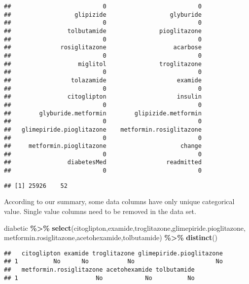 \documentclass[
]{article}
\newenvironment{Shaded}{\begin{snugshade}}{\end{snugshade}}
\newcommand{\FunctionTok}[1]{\textcolor[rgb]{0.13,0.29,0.53}{\textbf{#1}}}
\newcommand{\NormalTok}[1]{#1}
\newcommand{\SpecialCharTok}[1]{\textcolor[rgb]{0.81,0.36,0.00}{\textbf{#1}}}
\begin{document}
\begin{verbatim}
##                          0                          0 
##                  glipizide                  glyburide 
##                          0                          0 
##                tolbutamide               pioglitazone 
##                          0                          0 
##              rosiglitazone                   acarbose 
##                          0                          0 
##                   miglitol               troglitazone 
##                          0                          0 
##                 tolazamide                    examide 
##                          0                          0 
##                citoglipton                    insulin 
##                          0                          0 
##        glyburide.metformin        glipizide.metformin 
##                          0                          0 
##   glimepiride.pioglitazone    metformin.rosiglitazone 
##                          0                          0 
##     metformin.pioglitazone                     change 
##                          0                          0 
##                diabetesMed                 readmitted 
##                          0                          0
\end{verbatim}

\begin{verbatim}
## [1] 25926    52
\end{verbatim}

According to our summary, some data columns have only unique categorical
value. Single value columns need to be removed in the data set.

\begin{Shaded}
\begin{Highlighting}[]
\NormalTok{diabetic }\SpecialCharTok{\%\textgreater{}\%} \FunctionTok{select}\NormalTok{(citoglipton,examide,troglitazone,glimepiride.pioglitazone,}
\NormalTok{                    metformin.rosiglitazone,acetohexamide,tolbutamide) }\SpecialCharTok{\%\textgreater{}\%}
  \FunctionTok{distinct}\NormalTok{()}
\end{Highlighting}
\end{Shaded}

\begin{verbatim}
##   citoglipton examide troglitazone glimepiride.pioglitazone
## 1          No      No           No                       No
##   metformin.rosiglitazone acetohexamide tolbutamide
## 1                      No            No          No
\end{verbatim}
\end{document}
